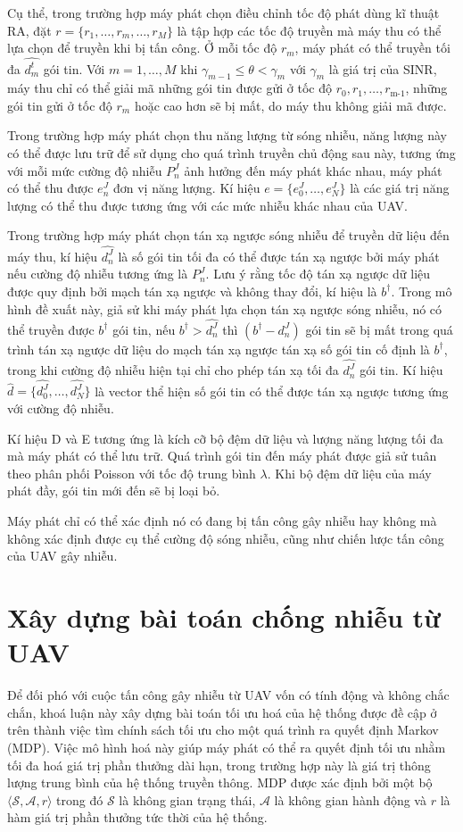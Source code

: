 \documentclass{uetgraduation}
\begin{document}
Cụ thể, trong trường hợp máy
phát chọn điều chỉnh tốc độ phát dùng kĩ thuật RA, đặt $r = \{r_1, \dots, r_m,\dots, r_M\}$ là tập hợp các tốc độ truyền mà máy thu có thể lựa chọn để truyền khi bị tấn
công. Ở mỗi tốc độ $r_m$, máy phát có thể truyền tối đa $\hat{d_m^t}$ gói tin. Với $m = 1, \dots, M$ khi $\gamma_{m-1} \leq \theta < \gamma_m$ với $\gamma_m$ là giá
trị của SINR, máy thu chỉ có thể giải mã những gói tin được gửi ở tốc độ $r_0, r_1, \dots, r_\text{m-1}$, những gói tin gửi ở tốc độ $r_m$ hoặc cao hơn sẽ bị mất,
do máy thu không giải mã được. 

Trong trường hợp máy phát chọn thu năng lượng từ sóng nhiễu, năng lượng này có thể được lưu trữ để sử dụng cho quá trình truyền chủ động sau này, tương ứng với mỗi mức cường độ nhiễu $P_n^J$
ảnh hưởng đến máy phát khác nhau, máy phát có thể thu được $e_n^J$ đơn vị năng lượng. Kí hiệu $e = \{e_0^J, \dots, e_N^J\}$ là các giá trị năng lượng có thể thu được tương ứng
với các mức nhiễu khác nhau của UAV.

Trong trường hợp máy phát chọn tán xạ ngược sóng nhiễu để truyền dữ liệu đến máy thu, kí hiệu $\hat{d_n^J}$ là số gói tin tối đa có thể được tán xạ ngược bởi máy phát nếu
cường độ nhiễu tương ứng là $P_n^J$. Lưu ý rằng tốc độ tán xạ ngược dữ liệu được quy định bởi mạch tán xạ ngược và không thay đổi, kí hiệu là $b^{\dagger}$. Trong mô hình đề xuất này,
giả sử khi máy phát lựa chọn tán xạ ngược sóng nhiễu, nó có thể truyền được $b^{\dagger}$ gói tin, nếu $b^{\dagger} > \hat{d_n^J}$ thì $(b^{\dagger} - d_n^J)$ gói tin sẽ bị mất trong
quá trình tán xạ ngược dữ liệu do mạch tán xạ ngược tán xạ số gói tin cố định là $b^{\dagger}$, trong khi cường độ nhiễu hiện tại chỉ cho phép tán xạ tối đa $\hat{d_n^J}$ gói tin. Kí 
hiệu $\hat{d} = \{\hat{d_0^J}, \dots, \hat{d_N^J}\}$ là vector thể hiện số gói tin có thể được tán xạ ngược tương ứng với cường độ nhiễu.

Kí hiệu D và E tương ứng là kích cỡ bộ đệm dữ liệu và lượng năng lượng tối đa mà máy phát có thể lưu trữ. Quá trình gói tin đến máy phát được giả sử tuân theo phân
phối Poisson với tốc độ trung bình $\lambda$. Khi bộ đệm dữ liệu của máy phát đầy, gói tin mới đến sẽ bị loại bỏ.

Máy phát chỉ có thể xác định nó có đang bị tấn công gây nhiễu hay không mà không xác định được cụ thể cường độ sóng nhiễu, cũng như chiến lược tấn công của UAV gây nhiễu.

\section{Xây dựng bài toán chống nhiễu từ UAV}
Để đối phó với cuộc tấn công gây nhiễu từ UAV vốn có tính động và không chắc chắn, khoá luận này xây dựng bài toán tối ưu hoá của hệ thống được đề cập ở trên thành việc tìm chính sách tối ưu cho một quá 
trình ra quyết định
Markov (MDP). Việc mô hình hoá này giúp máy phát có thể ra quyết định tối ưu nhằm tối đa hoá giá trị phần thưởng dài hạn, trong trường hợp này là giá trị thông lượng trung bình
của hệ thống truyền thông. MDP được xác định bởi một bộ $\langle \mathcal{S}, \mathcal{A}, r \rangle$ trong đó $\mathcal{S}$ là không gian trạng thái, $\mathcal{A}$ là không gian hành động và $r$ là hàm giá trị phần thưởng
tức thời của hệ thống.
\end{document}
